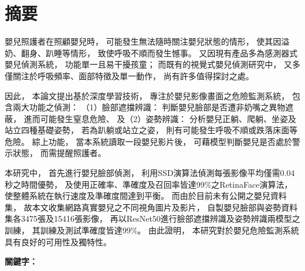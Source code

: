 \documentclass[class=NCU_thesis, crop=false]{standalone}
\begin{document}
\chapter{摘要}
嬰兒照護者在照顧嬰兒時，
可能發生無法隨時關注嬰兒狀態的情形，
使其因溢奶、翻身、趴睡等情形，
致使呼吸不順而發生憾事。
又因現有產品多為感測器式嬰兒偵測系統，
功能單一且易干擾孩童；
而既有的視覺式嬰兒偵測研究中，
又多僅關注於呼吸頻率、面部特徵及單一動作，
尚有許多值得探討之處。

因此，
本論文提出基於深度學習技術，
專注於嬰兒影像畫面之危險監測系統，
包含兩大功能之偵測：
（1）臉部遮擋辨識：
判斷嬰兒臉部是否遭非奶嘴之異物遮蔽，
進而可能發生窒息危險、
及（2）姿勢辨識：
分析嬰兒正躺、爬躺、坐姿及站立四種基礎姿勢，
若為趴躺或站立之姿，
則有可能發生呼吸不順或跌落床面等危險。
綜上功能，
當本系統讀取一段嬰兒影片後，
可藉模型判斷嬰兒是否處於警示狀態，
而需提醒照護者。

本研究中，
首先進行嬰兒臉部偵測，
利用SSD演算法偵測每張影像平均僅需0.04秒之時間優勢，
及使用正確率、準確度及召回率皆達99\%之RetinaFace演算法，
使整體系統在執行速度及準確度間達到平衡。
而由於目前未有公開之嬰兒資料集，
故本文收集網路真實嬰兒之不同視角圖片及影片，
自製嬰兒臉部與姿勢資料集各3475張及15416張影像，
再以ResNet50進行臉部遮擋辨識及姿勢辨識兩模型之訓練，
其訓練及測試準確度皆達99\%。
由此證明，
本研究對於嬰兒危險監測系統具有良好的可用性及獨特性。

\vspace{2em}
\noindent \textbf{關鍵字：} \keywordsZh{} %
\end{document}
